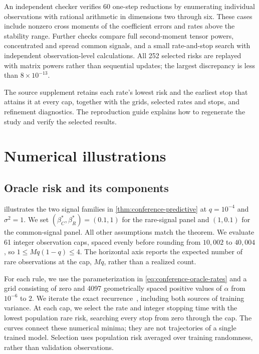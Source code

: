\documentclass{alt2027}
\begin{document}
An independent checker verifies 60 one-step reductions by enumerating individual
observations with rational arithmetic in dimensions two through six. These cases
include nonzero cross moments of the coefficient errors and rates above the
stability range. Further checks compare full second-moment tensor powers,
concentrated and spread common signals, and a small rate-and-stop search with
independent observation-level calculations. All 252 selected risks are replayed
with matrix powers rather than sequential updates; the largest discrepancy is
less than $8 \times 10^{-13}$.

The source supplement retains each rate's lowest risk and the earliest stop that
attains it at every cap, together with the grids, selected rates and stops, and
refinement diagnostics. The reproduction guide explains how to regenerate the
study and verify the selected results.

\section{Numerical illustrations}
\label{sec:predictive-intro-figure}

\subsection{Oracle risk and its components}

 illustrates the two signal families in
\cref{thm:conference-predictive} at $q = 10^{-4}$ and $\sigma^2 = 1$. We set
$(\beta_C^*,\beta_R^*) = (0.1,1)$ for the rare-signal panel and $(1,0.1)$ for
the common-signal panel. All other assumptions match the theorem. We evaluate 61
integer observation caps, spaced evenly before rounding from $10{,}002$ to
$40{,}004$, so $1 \leq Mq(1 - q) \leq 4$. The horizontal axis reports the
expected number of rare observations at the cap, $Mq$, rather than a realized
count.

For each rule, we use the parameterization in \cref{eq:conference-oracle-rates}
and a grid consisting of zero and 4097 geometrically spaced positive values of
$\alpha$ from $10^{-6}$ to $2$. We iterate the exact
recurrence~, including both sources of training
variance. At each cap, we select the rate and integer stopping time with the
lowest population rare risk, searching every stop from zero through the cap. The
curves connect these numerical minima; they are not trajectories of a single
trained model. Selection uses population risk averaged over training randomness,
rather than validation observations.
\end{document}
